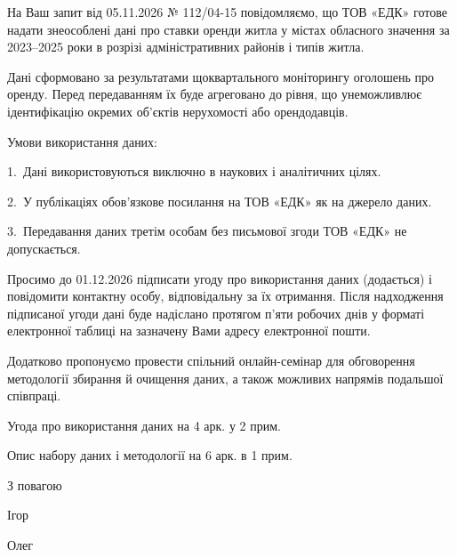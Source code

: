 \documentclass[14pt,onehalf]{dstu4163}
\begin{document}


На Ваш запит від 05.11.2026 № 112/04-15 повідомляємо, що ТОВ «ЕДК» готове
надати знеособлені дані про ставки оренди житла у містах обласного значення
за 2023–2025 роки в розрізі адміністративних районів і типів житла.

Дані сформовано за результатами щоквартального моніторингу оголошень
про оренду. Перед передаванням їх буде агреговано до рівня, що унеможливлює
ідентифікацію окремих об'єктів нерухомості або орендодавців.

Умови використання даних:

1.~Дані використовуються виключно в наукових і аналітичних цілях.

2.~У публікаціях обов'язкове посилання на ТОВ «ЕДК» як на джерело даних.

3.~Передавання даних третім особам без письмової згоди ТОВ «ЕДК» не
допускається.

Просимо до 01.12.2026 підписати угоду про використання даних (додається)
і повідомити контактну особу, відповідальну за їх отримання. Після
надходження підписаної угоди дані буде надіслано протягом п'яти робочих днів
у форматі електронної таблиці на зазначену Вами адресу електронної пошти.

Додатково пропонуємо провести спільний онлайн-семінар для обговорення
методології збирання й очищення даних, а також можливих напрямів
подальшої співпраці.

\begin{attachments}
  \item Угода про використання даних на 4 арк. у 2 прим.
  \item Опис набору даних і методології на 6 арк. в 1 прим.
\end{attachments}

\closing{З повагою}

\signature{Директор}{Ігор }
\signature[seal]{Начальник відділу\\ прикладних досліджень}{Олег }

\end{document}
